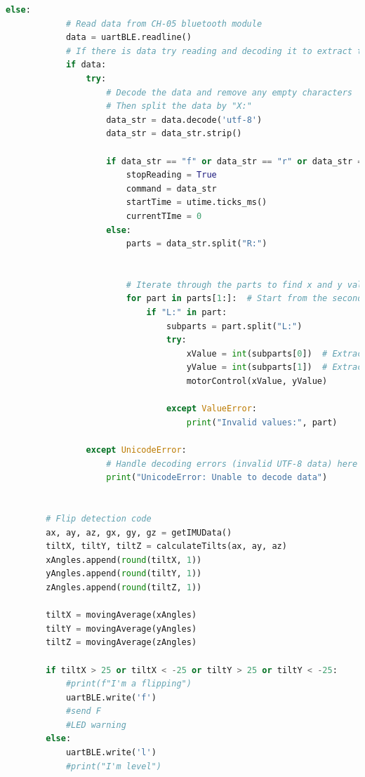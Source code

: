 \documentclass[conference]{IEEEtran}
\begin{document}
\begin{lstlisting}[language=Python, caption=RC Wheelchair Code, label=rc_wheelchair_code]
        else:
            # Read data from CH-05 bluetooth module
            data = uartBLE.readline()
            # If there is data try reading and decoding it to extract the x and y values
            if data:
                try:
                    # Decode the data and remove any empty characters
                    # Then split the data by "X:"
                    data_str = data.decode('utf-8')
                    data_str = data_str.strip()
                    
                    if data_str == "f" or data_str == "r" or data_str == "l" or data_str == "b":
                        stopReading = True
                        command = data_str
                        startTime = utime.ticks_ms()
                        currentTIme = 0
                    else:
                        parts = data_str.split("R:")
                        
                        
                        # Iterate through the parts to find x and y values
                        for part in parts[1:]:  # Start from the second part to skip the empty part before "X:"
                            if "L:" in part:
                                subparts = part.split("L:")
                                try:
                                    xValue = int(subparts[0])  # Extract and convert x value to an integer
                                    yValue = int(subparts[1])  # Extract and convert y value to an integer
                                    motorControl(xValue, yValue)

                                except ValueError:
                                    print("Invalid values:", part)
                                      
                except UnicodeError:
                    # Handle decoding errors (invalid UTF-8 data) here if needed
                    print("UnicodeError: Unable to decode data")
            
        
        # Flip detection code
        ax, ay, az, gx, gy, gz = getIMUData()
        tiltX, tiltY, tiltZ = calculateTilts(ax, ay, az)
        xAngles.append(round(tiltX, 1))
        yAngles.append(round(tiltY, 1))
        zAngles.append(round(tiltZ, 1))
        
        tiltX = movingAverage(xAngles)
        tiltY = movingAverage(yAngles)
        tiltZ = movingAverage(zAngles)
        
        if tiltX > 25 or tiltX < -25 or tiltY > 25 or tiltY < -25:
            #print(f"I'm a flipping")
            uartBLE.write('f')
            #send F
            #LED warning
        else:
            uartBLE.write('l')
            #print("I'm level")
        

\end{lstlisting}
\end{document}
